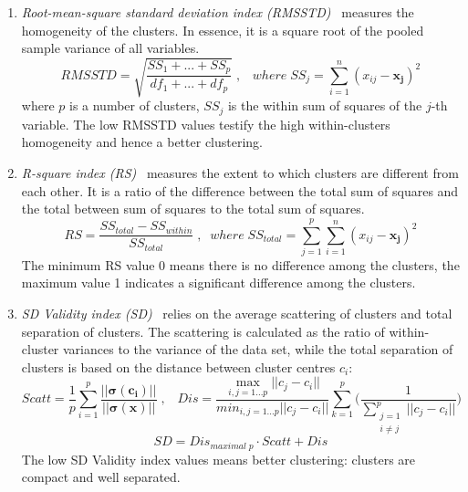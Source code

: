\begin{enumerate}
  \item \textit{Root-mean-square standard deviation index (RMSSTD)}~\cite{sharma1996RMSSDT} measures the homogeneity of the clusters. In essence, it is a square root of the pooled sample variance of all variables.
      \begin{equation}
    RMSSTD = \sqrt{\frac{SS_1+...+SS_p}{df_1+...+df_p}}\;,\;\;\; where\;SS_j = \sum_{i=1}^{n}(x_{ij}- \boldsymbol{x_j} )^2
    \label{eq:equat18}
    \end{equation}
  where $p$ is a number of clusters, $SS_j$ is the within sum of squares of the $j$-th variable. The low RMSSTD values testify the high within-clusters homogeneity and hence a better clustering.
  
  \item \textit{R-square index (RS)}~\cite{sharma1996RMSSDT} measures the extent to which clusters are different from each other. It is a ratio of the difference between the total sum of squares and the total between sum of squares to the total sum of squares.
    \begin{equation}
    RS = \frac{SS_{total}-SS_{within}}{SS_{total}}\;,\;\; where\;SS_{total}=\sum_{j=1}^p \sum_{i=1}^n (x_{ij}-\boldsymbol{x_j})^2
    \label{eq:equat19}
    \end{equation}
  The minimum RS value 0 means there is no difference among the clusters, the maximum value 1 indicates a significant difference among the clusters.
  
  \item \textit{SD Validity index (SD)}~\cite{halkidi2000quality} relies on the average scattering of clusters and total separation of clusters. The scattering is calculated as the ratio of within-cluster variances to the variance of the data set, while the total separation of clusters is based on the distance between cluster centres $c_i$:
    \begin{equation}
        Scatt = \frac{1}{p}\sum_{i=1}^p \frac{||\boldsymbol{\sigma(c_i)}||}{||\boldsymbol{\sigma(x)}||}\;,\;\;\; Dis = \frac{\max_{i,j=1...p}||c_j-c_i||}{min_{i,j=1...p}||c_j-c_i||}\sum_{k=1}^p \bigg(\frac{1}{\sum_{\substack{j=1 \\ i\neq j}}^p ||c_j-c_i||}\bigg)
    \label{eq:equat20}
    \end{equation}
    \begin{equation}
        SD = Dis_{maximal\;p} \cdot Scatt + Dis
    \label{eq:equat21}
    \end{equation}
    The low SD Validity index values means better clustering: clusters are compact and well separated.
    

\end{enumerate}
